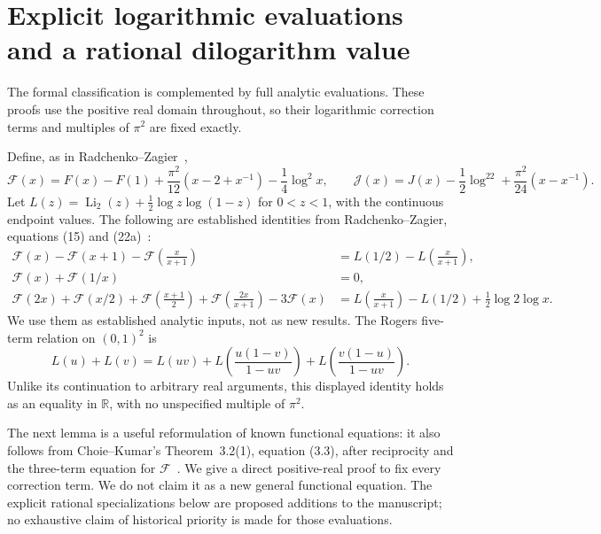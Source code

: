 \section{Explicit logarithmic evaluations and a rational dilogarithm value}
\label{jnew:sec:analytic}

The formal classification is complemented by full analytic evaluations.
These proofs use the positive real domain throughout, so their
logarithmic correction terms and multiples of $\pi^2$ are fixed exactly.

Define, as in Radchenko--Zagier~\cite{RadchenkoZagier},
\[
 \mathcal F(x)=F(x)-F(1)
  +\frac{\pi^2}{12}(x-2+x^{-1})-\frac14\log^2x,
 \qquad
 \mathcal J(x)=J(x)-\frac12\log^22
  +\frac{\pi^2}{24}(x-x^{-1}).
\]
Let $L(z)=\operatorname{Li}_2(z)+\tfrac12\log z\log(1-z)$ for
$0<z<1$, with the continuous endpoint values. The following are
established identities from Radchenko--Zagier,
equations (15) and (22a)~\cite{RadchenkoZagier}:
\begin{align}
 \mathcal F(x)-\mathcal F(x+1)-\mathcal F\left(\frac{x}{x+1}\right)
 &=L(1/2)-L\left(\frac{x}{x+1}\right),
 \label{jnew:eq:RZ-three}\\
 \mathcal F(x)+\mathcal F(1/x)&=0,
 \label{jnew:eq:RZ-recip}\\
 \mathcal F(2x)+\mathcal F(x/2)
 +\mathcal F\left(\frac{x+1}{2}\right)
 +\mathcal F\left(\frac{2x}{x+1}\right)-3\mathcal F(x)
 &=L\left(\frac{x}{x+1}\right)-L(1/2)
   +\tfrac12\log2\log x.
 \label{jnew:eq:RZ-Hecke2}
\end{align}
We use them as established analytic inputs, not as new results.
The Rogers five-term relation on $(0,1)^2$ is
\begin{equation}\label{jnew:eq:Rogers}
 L(u)+L(v)=L(uv)+L\left(\frac{u(1-v)}{1-uv}\right)
                    +L\left(\frac{v(1-u)}{1-uv}\right).
\end{equation}
Unlike its continuation to arbitrary real arguments, this displayed
identity holds as an equality in $\mathbb R$, with no unspecified
multiple of $\pi^2$.

The next lemma is a useful reformulation of known functional equations:
it also follows from Choie--Kumar's Theorem~3.2(1), equation (3.3),
after reciprocity and the three-term equation for
$\mathcal F$~\cite{ChoieKumar2023}. We give a direct positive-real
proof to fix every correction term. We do not claim it as a new
general functional equation. The explicit rational specializations
below are proposed additions to the manuscript; no exhaustive claim
of historical priority is made for those evaluations.

